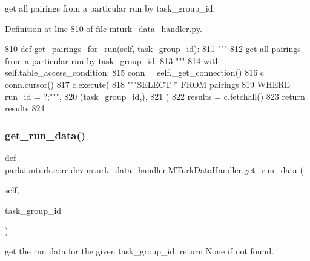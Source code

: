 \begin{DoxyVerb}get all pairings from a particular run by task_group_id.
\end{DoxyVerb}
 

Definition at line 810 of file mturk\+\_\+data\+\_\+handler.\+py.


\begin{DoxyCode}
810     \textcolor{keyword}{def }get\_pairings\_for\_run(self, task\_group\_id):
811         \textcolor{stringliteral}{"""}
812 \textcolor{stringliteral}{        get all pairings from a particular run by task\_group\_id.}
813 \textcolor{stringliteral}{        """}
814         with self.table\_access\_condition:
815             conn = self.\_get\_connection()
816             c = conn.cursor()
817             c.execute(
818                 \textcolor{stringliteral}{"""SELECT * FROM pairings}
819 \textcolor{stringliteral}{                         WHERE run\_id = ?;"""},
820                 (task\_group\_id,),
821             )
822             results = c.fetchall()
823             \textcolor{keywordflow}{return} results
824 
\end{DoxyCode}
\mbox{\label{classparlai_1_1mturk_1_1core_1_1dev_1_1mturk__data__handler_1_1MTurkDataHandler_a915eb49ef703f1606b8039a76b6a9385}} 
\subsubsection{\texorpdfstring{get\+\_\+run\+\_\+data()}{get\_run\_data()}}
{\footnotesize\ttfamily def parlai.\+mturk.\+core.\+dev.\+mturk\+\_\+data\+\_\+handler.\+M\+Turk\+Data\+Handler.\+get\+\_\+run\+\_\+data (\begin{DoxyParamCaption}\item[{}]{self,  }\item[{}]{task\+\_\+group\+\_\+id }\end{DoxyParamCaption})}

\begin{DoxyVerb}get the run data for the given task_group_id, return None if not found.
\end{DoxyVerb}
 

